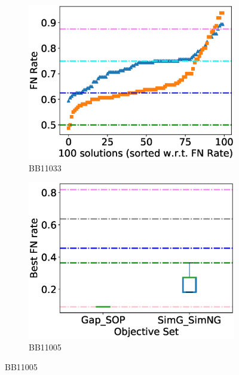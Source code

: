 \begin{figure}[!htbp]
\begin{adjustwidth}{-1cm}{-1cm}
\begin{subfigure}[b]{0.26\textwidth}
			\includegraphics[width=\columnwidth]{Figure/summary/precomputedInit/Balibase/BB11033_fnrate_density_single_run}
			\caption{BB11033}
		\end{subfigure}
		\begin{subfigure}{0.26\textwidth}
			\includegraphics[width=\columnwidth]{Figure/summary/precomputedInit/Balibase/BB11005_objset_fnrate_rank}
			\caption{BB11005}

\end{subfigure}
\end{adjustwidth}
\end{figure}
